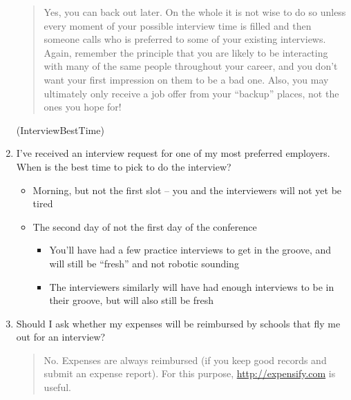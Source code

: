 \documentclass{\classes/econtex}
\providecommand\phantomsection{}
\begin{document}
\begin{enumerate}
  \begin{quote}
    Yes, you can back out later.  On the whole it is not wise to do so unless every moment of your possible interview time is filled and then someone calls who is preferred to some of your existing interviews.  Again, remember the principle that you are likely to be interacting with many of the same people throughout your career, and you don't want your first impression on them to be a bad one.  Also, you may ultimately only receive a job offer from your ``backup'' places, not the ones you hope for!

  \end{quote}
  \ifdvi\phantomsection\hypertarget{InterviewBestTime}{(InterviewBestTime)}\fi
  
\item  I've received an interview request for one of my most preferred employers. When is the best time to pick to do the interview?
  \begin{itemize}
  \item Morning, but not the first slot -- you and the interviewers will not yet be tired
  \item The second day of not the first day of the conference
    \begin{itemize}
    \item You'll have had a few practice interviews to get in the groove, and will still be ``fresh'' and not robotic sounding
    \item The interviewers similarly will have had enough interviews to be in their groove, but will also still be fresh
    \end{itemize}
  \end{itemize}

\item  Should I ask whether my expenses will be reimbursed by schools that fly me out for an interview?
  \begin{quote}
    No.  Expenses are always reimbursed (if you keep good records and submit an expense report).  For this purpose, \url{http://expensify.com} is useful.

  \end{quote}


\end{enumerate}
\end{document}
